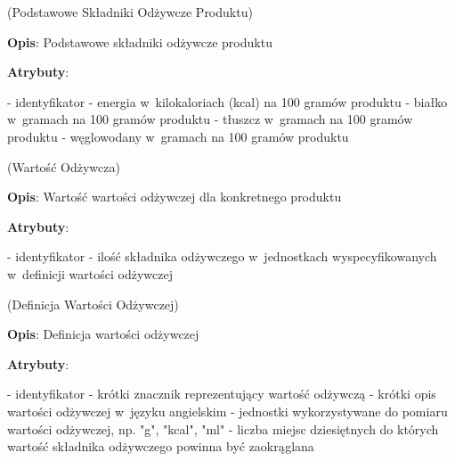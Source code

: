\begin{enumerate}[label={\textbf{KAT/\protect\threedigits{\theenumi}}}, wide, labelwidth=!, labelindent=0pt, labelsep=0pt, series=reqs]
    \label{kat:ProductBasicNutritionData} (Podstawowe Składniki Odżywcze Produktu)

    \textbf{Opis}: Podstawowe składniki odżywcze produktu
    \par
    \textbf{Atrybuty}:
    \begin{itemize}[series=atr, wide, align=left, leftmargin=190pt]
        \label{kat:ProductBasicNutritionData:id}- identyfikator
        \label{kat:ProductBasicNutritionData:energy}- energia w~kilokaloriach (kcal) na 100 gramów produktu
        \label{kat:ProductBasicNutritionData:protein}- białko w~gramach na 100 gramów produktu
        \label{kat:ProductBasicNutritionData:fat}- tłuszcz w~gramach na 100 gramów produktu
        \label{kat:ProductBasicNutritionData:carbohydrates}- węglowodany w~gramach na 100 gramów produktu
    \end{itemize}

    \label{kat:NutritionData} (Wartość Odżywcza)

    \textbf{Opis}: Wartość wartości odżywczej dla konkretnego produktu
    \par
    \textbf{Atrybuty}:
    \begin{itemize}[series=atr, wide, align=left, leftmargin=190pt]
        \label{kat:NutritionData:id}- identyfikator
        \label{kat:NutritionData:nutritionValue}- ilość składnika odżywczego w~jednostkach wyspecyfikowanych w~definicji wartości odżywczej
    \end{itemize}

    \label{kat:NutritionDefinition} (Definicja Wartości Odżywczej)

    \textbf{Opis}: Definicja wartości odżywczej
    \par
    \textbf{Atrybuty}:
    \begin{itemize}[series=atr, wide, align=left, leftmargin=190pt]
        \label{kat:NutritionDefinition:id}- identyfikator
        \label{kat:NutritionDefinition:tag}- krótki znacznik reprezentujący wartość odżywczą
        \label{kat:NutritionDefinition:description}- krótki opis wartości odżywczej w~języku angielskim
        \label{kat:NutritionDefinition:units}- jednostki wykorzystywane do pomiaru wartości odżywczej, np. "g", "kcal", "ml"
        \label{kat:NutritionDefinition:decimalPlaces}- liczba miejsc dziesiętnych do których wartość składnika odżywczego powinna być zaokrąglana
    \end{itemize}


\end{enumerate}
